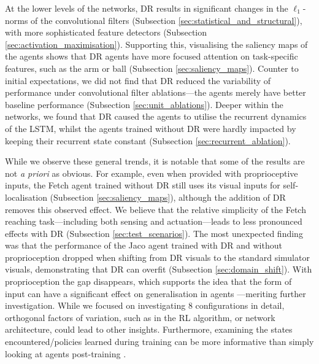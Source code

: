 At the lower levels of the networks, DR results in significant changes
in the \(\ell_1\)-norms of the convolutional filters (Subsection
\ref{sec:statistical_and_structural}), with more sophisticated feature
detectors (Subsection \ref{sec:activation_maximisation}). Supporting
this, visualising the saliency maps of the agents shows that DR agents
have more focused attention on task-specific features, such as the arm
or ball (Subsection \ref{sec:saliency_maps}). Counter to initial
expectations, we did not find that DR reduced the variability of
performance under convolutional filter ablations---the agents merely
have better baseline performance (Subsection \ref{sec:unit_ablations}).
Deeper within the networks, we found that DR caused the agents to
utilise the recurrent dynamics of the LSTM, whilst the agents trained
without DR were hardly impacted by keeping their recurrent state
constant (Subsection \ref{sec:recurrent_ablation}).

While we observe these general trends, it is notable that some of the
results are not \emph{a priori} as obvious. For example, even when
provided with proprioceptive inputs, the Fetch agent trained without DR
still uses its visual inputs for self-localisation (Subsection
\ref{sec:saliency_maps}), although the addition of DR removes this
observed effect. We believe that the relative simplicity of the Fetch
reaching task---including both sensing and actuation---leads to less
pronounced effects with DR (Subsection \ref{sec:test_scenarios}). The
most unexpected finding was that the performance of the Jaco agent
trained with DR and without proprioception dropped when shifting from DR
visuals to the standard simulator visuals, demonstrating that DR can
overfit (Subsection \ref{sec:domain_shift}). With proprioception the gap
disappears, which supports the idea that the form of input can have a
significant effect on generalisation in agents
\cite{hill2019emergent}---meriting further investigation. While we
focused on investigating 8 configurations in detail, orthogonal factors
of variation, such as in the RL algorithm, or network architecture,
could lead to other insights. {Furthermore, examining the states encountered/policies learned during training can be more informative than simply looking at agents post-training}
\cite{sequeira2020interestingness}.

